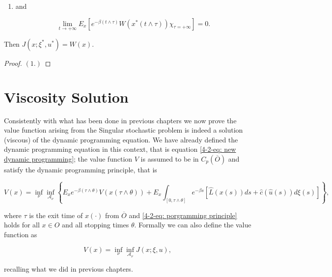 \begin{theorem}
\begin{enumerate}[label=(\arabic*.)]
\begin{enumerate}[label=(2.\alph*.)]
            \item and 
            
            \[\lim_{t\to+\infty} E_x\left[e^{-\beta(t\land\tau)}W(x^{\ast}(t\land\tau))\chi_{\tau=+\infty}\right] = 0.\]
        \end{enumerate}

        Then $J(x;\xi^{\ast},u^{\ast}) = W(x)$.
    \end{enumerate}

    \begin{proof}
        $(\textit{1}.)$ 
    \end{proof}
\end{theorem}


\section{Viscosity Solution}

Consistently with what has been done in previous chapters we now prove the value function arising from the Singular stochastic problem is indeed a solution (viscous) of the dynamic programming equation. We have already defined the dynamic programming equation in this context, that is equation \eqref{4-2-eq: new dynamic programming}; the value function $V$ is assumed to be in $C_p(\overline{O})$ and satisfy the dynamic programming principle, that is 

\begin{equation}\label{4-2-eq: porgramming principle}
    V(x) = \inf_{\nu} \inf_{\mathcal{A}_{\nu}} \left\{E_xe^{-\beta(\tau\land\theta)}V(x(\tau\land\theta)) + E_x\int_{[0,\tau\land\theta]}e^{-\beta s}\left[\hat{L}(x(s))ds + \hat{c}(\hat{u}(s))d\xi(s)\right]\right\},
\end{equation}

where $\tau$ is the exit time of $x(\cdot)$ from $\overline{O}$ and \eqref{4-2-eq: porgramming principle} holds for all $x\in O$ and all stopping times $\theta$. Formally we can also define the value function as

\begin{equation}
    V(x) = \inf_{\nu}\inf_{\mathcal{A}_{\nu}} J(x;\xi,u),
\end{equation}

recalling what we did in previous chapters.


